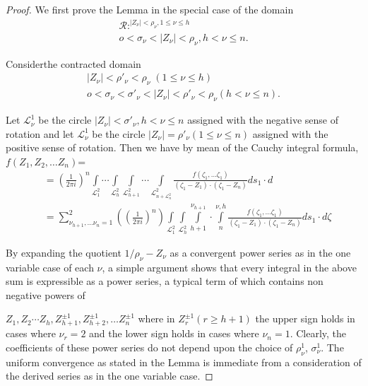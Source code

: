 \begin{proof}
We first prove the Lemma in the special case of the domain
\begin{gather*}
\mathcal{R}:^{|Z_\nu|< \rho_\nu,1 \le \nu \le h}\\
{o<\sigma_\nu <|Z_\nu|< \rho_\nu, h< \nu \le n}.
\end{gather*}

Consider\pageoriginale the contracted domain
\begin{gather*}
|Z_\nu|< \rho'_\nu < \rho_\nu \;  (1 \le \nu \le h)\\
o <\sigma _\nu <\sigma' _\nu < |Z_\nu| < \rho'_\nu < \rho_\nu (h < \nu
\le n). 
\end{gather*}

Let $\mathcal{L}^1_\nu$ be the circle $|Z_\nu|< \sigma'_\nu,h < \nu
\le n$ assigned with the negative sense of rotation and let
$\mathcal{L}^1_\nu$ be the circle $|Z_\nu |=  \rho' _\nu (1 \le\nu \leq
n)$ assigned with the positive sense of rotation. Then we have by
mean of the Cauchy integral formula, $f(Z_1,Z_2, \ldots Z_n)$= 
\begin{align*}
&= (\frac{1}{2 \pi i})^n \int \limits_{\mathcal{L}^2_1} \cdots \int
  \limits_{\mathcal{L}^2_h}\int \limits_{\mathcal{L}^2_{h+1}} \cdots
  \int \limits_{\mathcal{L}^2_{n +\mathcal{L}^2_n}} \frac{f(\zeta _1,
    \ldots \zeta _1)}{(\zeta _1-Z_1)\cdot (\zeta _1-Z_n)} ds_1 \cdot
  d\\ 
&=\sum ^2_{\nu_{h+1}, \ldots \nu_n=1} ((\frac{1}{2 \pi i})^n )\int
  \limits_{\mathcal{L}^2_1} \int \limits_{\mathcal{L}^2_h} \int
  \limits ^{\nu_{h+1}}_{h+1} \cdot \int \limits _n ^{\nu
    ,h}\frac{f(\zeta _1, \ldots \zeta _1)}{(\zeta _1-Z_1)\cdot (\zeta
    _1-Z_n)} ds_1 \cdot d\zeta 
\end{align*}

By expanding the quotient $1/\rho_\nu - Z_\nu$ as a convergent power
series as in the one variable case of each $\nu$, a simple argument
shows that every integral in the above sum is expressible as a power
series, a typical term of which contains non negative powers of  

$Z_1,Z_2 \cdots Z_h, Z^{\pm 1}_{h+1},Z^{\pm 1}_{h+2}, \ldots Z^{\pm
  1}_{n}$ where in $ Z^{\pm 1}_{r}(r \ge h+ 1)$ the upper sign holds
in cases where $\nu_r = 2$ and the lower sign holds in cases where
$\nu_n=1$. Clearly, the coefficients of these power series do 
not depend upon the choice of $\rho^1 _\nu$, $\sigma ^1_ \nu$. The
uniform convergence as stated in the Lemma is immediate from a
consideration of the derived series as in the one variable case. 


\end{proof}
